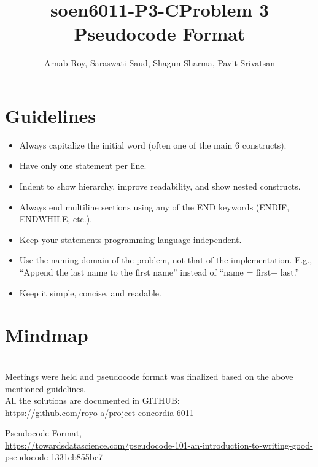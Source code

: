 \documentclass{article}
\title{soen6011-P3-C}
\title{Problem 3 Pseudocode Format}
\author{Arnab Roy, Saraswati Saud, Shagun Sharma, Pavit Srivatsan }
\date{}
\begin{document}
\maketitle

\section{Guidelines}
\begin{itemize}
\item Always capitalize the initial word (often one of the main 6 constructs).\\
\item Have only one statement per line.\\
\item Indent to show hierarchy, improve readability, and show nested constructs.\\
\item Always end multiline sections using any of the END keywords (ENDIF, ENDWHILE, etc.).\\
\item Keep your statements programming language independent.
\item Use the naming domain of the problem, not that of the implementation. E.g., “Append the last name to the first name” instead of “name = first+ last.”\\
\item Keep it simple, concise, and readable.\\
\end{itemize}
\section{Mindmap}\\
Meetings were held and pseudocode format was finalized based on the above mentioned guidelines. \\

All the solutions are documented in GITHUB:\\
\url{https://github.com/royo-a/project-concordia-6011}

\begin{thebibliography}{9}
Pseudocode Format,\\
\url{https://towardsdatascience.com/pseudocode-101-an-introduction-to-writing-good-pseudocode-1331cb855be7}
\end{thebibliography}
\end{document}
